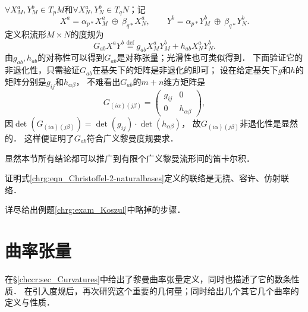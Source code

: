 $\forall X_M^a, Y_M^b \in T_p M$和$\forall X_N^a, Y_N^b \in T_q N$；记
\begin{equation}
    X^a=\alpha_{p*} X_M^a \ \oplus\ \beta_{q*}  X_N^a, \qquad Y^b=\alpha_{p*} Y_M^b \ \oplus\ \beta_{q*}  Y_N^b .
\end{equation}
定义积流形$M\times N$的度规为
\begin{equation}\label{chrg:eqn_metric-product}
    G_{ab}X^a Y^b \overset{\mathrm {def}}{=} g_{ab}X^a_M Y^b_M + h_{ab}X^a_N Y^b_N .
\end{equation}
由$g_{ab},h_{ab}$的对称性可以得到$G_{ab}$是对称张量；光滑性也可类似得到．
下面验证它的非退化性，只需验证$G_{ab}$在基矢下的矩阵是非退化的即可；
设在给定基矢下$g$和$h$的矩阵分别是$g_{ij}$和$h_{\alpha\beta}$，
不难看出$G_{ab}$的$m+n$维方矩阵是
\begin{equation}
    G_{(i\alpha)(j\beta)}=\begin{pmatrix}
        g_{ij} & 0 \\ 0 & h_{\alpha\beta}
    \end{pmatrix},
\end{equation}
因$\det(G_{(i\alpha)(j\beta)})=\det(g_{ij}) \cdot \det(h_{\alpha\beta})$，
故$G_{(i\alpha)(j\beta)}$非退化性是显然的．
这样便证明了$G_{ab}$符合广义黎曼度规要求．


显然本节所有结论都可以推广到有限个广义黎曼流形间的笛卡尔积．

\begin{exercise}
	证明式\eqref{chrg:eqn_Christoffel-2-naturalbases}定义的联络是无挠、容许、仿射联络．
\end{exercise}


\begin{exercise}
	详尽给出例题\ref{chrg:exam_Koszul}中略掉的步骤．
\end{exercise}



\section{曲率张量}
在\S \ref{chccr:sec_Curvatures}中给出了黎曼曲率张量定义，同时也描述了它的数条性质．
在引入度规后，再次研究这个重要的几何量；同时给出几个其它几个曲率的定义与性质．

